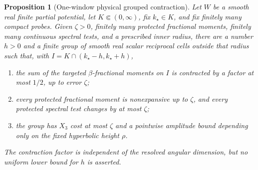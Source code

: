 \documentclass[11pt]{article}
\newtheorem{proposition}[theorem]{Proposition}
\theoremstyle{remark}
\begin{document}
\begin{proposition}[One-window physical grouped contraction]
\label{prop:physical-grouped-one-window}
Let $W$ be a smooth real finite partial potential, let
$K\Subset(0,\infty)$, fix $k_\star\in K$, and fix finitely many compact probes.  Given
$\zeta>0$, finitely many protected fractional moments, finitely many
continuous spectral tests, and a prescribed inner radius, there are a number
$h>0$ and a finite group of smooth real scalar reciprocal cells outside that
radius such that, with $I=K\cap(k_\star-h,k_\star+h)$,
\begin{enumerate}
 \item the sum of the targeted $\beta$-fractional moments on $I$ is contracted
 by a factor at most $1/2$, up to error $\zeta$;
 \item every protected fractional moment is nonexpansive up to $\zeta$, and
 every protected spectral test changes by at most $\zeta$;
 \item the group has $X_3$ cost at most $\zeta$ and a pointwise
 amplitude bound depending only on the fixed hyperbolic height $\rho$.
\end{enumerate}
The contraction factor is independent of the resolved angular dimension, but
no uniform lower bound for $h$ is asserted.
\end{proposition}
\end{document}
